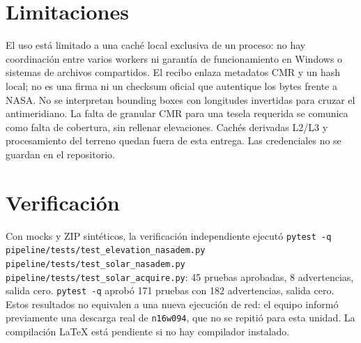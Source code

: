 \documentclass[11pt]{article}
\begin{document}
\section{Limitaciones}
El uso está limitado a una caché local exclusiva de un proceso: no hay coordinación entre varios workers ni garantía de funcionamiento en Windows o sistemas de archivos compartidos. El recibo enlaza metadatos CMR y un hash local; no es una firma ni un checksum oficial que autentique los bytes frente a NASA. No se interpretan bounding boxes con longitudes invertidas para cruzar el antimeridiano. La falta de granular CMR para una tesela requerida se comunica como falta de cobertura, sin rellenar elevaciones. Cachés derivadas L2/L3 y procesamiento del terreno quedan fuera de esta entrega. Las credenciales no se guardan en el repositorio.

\section{Verificación}
Con mocks y ZIP sintéticos, la verificación independiente ejecutó \texttt{pytest -q pipeline/tests/test\_elevation\_nasadem.py pipeline/tests/test\_solar\_nasadem.py pipeline/tests/test\_solar\_acquire.py}: 45 pruebas aprobadas, 8 advertencias, salida cero. \texttt{pytest -q} aprobó 171 pruebas con 182 advertencias, salida cero. Estos resultados no equivalen a una nueva ejecución de red: el equipo informó previamente una descarga real de \texttt{n16w094}, que no se repitió para esta unidad. La compilación LaTeX está pendiente si no hay compilador instalado.
\end{document}
